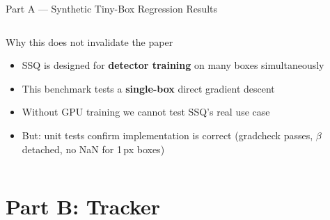 \documentclass[aspectratio=169, 10pt]{beamer}
\begin{document}
\begin{frame}{Part A — Synthetic Tiny-Box Regression Results}
\begin{columns}[T]
    \vspace{0.4em}
    \begin{block}{Why this does not invalidate the paper}
      \begin{itemize}
        \item SSQ is designed for \textbf{detector training} on many boxes simultaneously
        \item This benchmark tests a \textbf{single-box} direct gradient descent
        \item Without GPU training we cannot test SSQ's real use case
        \item But: unit tests confirm implementation is correct (gradcheck passes, $\beta$ detached, no NaN for 1\,px boxes)
      \end{itemize}
    \end{block}

  \end{columns}
\end{frame}

\section{Part B: Tracker}
\end{document}
